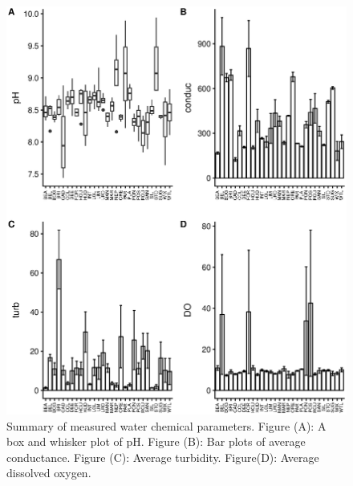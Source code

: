 \begin{figure}[!hp]
\centering
\includegraphics[width=\textwidth]{figures/watboxplotlake.eps}
\caption{Summary of measured water chemical parameters. Figure (A): A box and whisker plot of pH. Figure (B): Bar plots of average conductance. Figure (C): Average turbidity. Figure(D): Average dissolved oxygen. }
  \end{figure}
